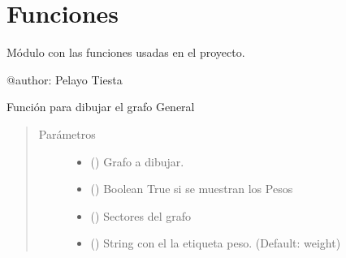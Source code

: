 \documentclass[letterpaper,10pt,spanish]{sphinxmanual}
\begin{document}
\chapter{Funciones}
\label{\detokenize{Funciones:funciones}}\label{\detokenize{Funciones::doc}}
\sphinxAtStartPar
Módulo con las funciones usadas en el proyecto.

\label{\detokenize{Funciones:module-Funciones}}
\sphinxAtStartPar
@author: Pelayo Tiesta

\begin{fulllineitems}
\label{\detokenize{Funciones:Funciones.DibujarGrafoGeneral}}
\sphinxAtStartPar
Función para dibujar el grafo General
\begin{quote}\begin{description}
\item[{Parámetros}] \leavevmode\begin{itemize}
\item {} 
\sphinxAtStartPar
{} () \textendash{} Grafo a dibujar.

\item {} 
\sphinxAtStartPar
{} () \textendash{} Boolean \sphinxhyphen{} True si se muestran los Pesos

\item {} 
\sphinxAtStartPar
{} () \textendash{} Sectores del grafo

\item {} 
\sphinxAtStartPar
{} (\sphinxstyleliteralemphasis{\sphinxupquote{, }}) \textendash{} String con el la etiqueta peso. (Default: weight)

\end{itemize}

\end{description}\end{quote}

\end{fulllineitems}
\end{document}
